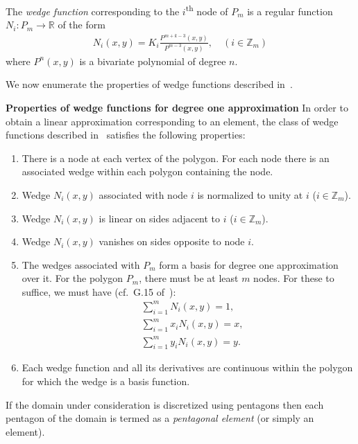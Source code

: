 \begin{definition}
  The \emph{wedge function} corresponding to the $i$\textsuperscript{th} node of
  $P_m$ is a regular function $N_i: P_m \rightarrow \mathbb{R}$ of the form
  \begin{eqnarray}
    N_i(x,y)= K_i\frac{P^{m+k-3}(x,y)}{P^{m-3}(x,y)},\quad (i\in\mathbb{Z}_m)\label{eq1}
  \end{eqnarray}
  where $P^n(x,y)$ is a bivariate polynomial of degree $n$.
\end{definition}

We now enumerate the properties of wedge functions described in~\cite{wachs}.

\textbf{Properties of wedge functions for degree one approximation}\:\cite{wachs}
In order to obtain a linear approximation corresponding to an element, the class
of wedge functions described in~\cite{wachs} satisfies the following properties:
\begin{enumerate}
  \item There is a node at each vertex of the polygon. For each node there is an
        associated wedge within each polygon containing the node.
  \item Wedge $N_i(x,y)$ associated with node $i$ is normalized to unity at $i$
        ($i\in\mathbb{Z}_m$).
  \item Wedge $N_i(x,y)$ is linear on sides adjacent to $i$
        ($i\in\mathbb{Z}_m$).
  \item{\label{4_2}} Wedge $N_i(x,y)$ vanishes on sides opposite to node
        $i$.
  \item{\label{5_2}} The wedges associated with $P_m$ form a basis for
        degree one approximation over it. For the polygon $P_m$, there must be at least
        $m$ nodes. For these to suffice, we must have (cf.~G.15 of~\cite{das1}):
        \begin{align}
          &\sum_{i=1}^{m}N_i(x,y) = 1, \label{2.1_1}\\
          &\sum_{i=1}^{m}x_iN_i(x,y) = x,\\
          &\sum_{i=1}^{m}y_iN_i(x,y) = y.
        \end{align}
  \item Each wedge function and all its derivatives are continuous within the polygon
        for which the wedge is a basis function.
\end{enumerate}

\begin{definition}
  If the domain under consideration is discretized using pentagons then each
  pentagon of the domain is termed as a \emph{pentagonal element} (or simply an
  element).
\end{definition}

